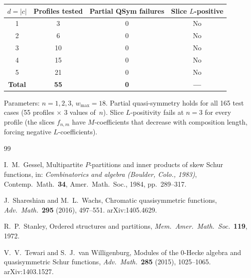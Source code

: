 \documentclass[11pt]{article}
\begin{document}
\begin{center}
\begin{tabular}{c|c|c|c}
  $d = |c|$ & Profiles tested & Partial QSym failures
  & Slice $L$-positive \\
  \hline
  1 & 3 & 0 & No \\
  2 & 6 & 0 & No \\
  3 & 10 & 0 & No \\
  4 & 15 & 0 & No \\
  5 & 21 & 0 & No \\
  \hline
  \textbf{Total} & \textbf{55} & \textbf{0} & \textbf{---}
\end{tabular}
\end{center}

Parameters: $n = 1, 2, 3$, $w_{\max} = 18$.
Partial quasi-symmetry holds for all 165 test cases
(55 profiles $\times$ 3 values of~$n$).
Slice $L$-positivity fails at $n = 3$ for every profile
(the slices $f_{n,m}$ have $M$-coefficients that decrease
with composition length, forcing negative $L$-coefficients).


\begin{thebibliography}{99}

I.~M.~Gessel,
Multipartite $P$-partitions and inner products of skew Schur functions,
in: \emph{Combinatorics and algebra (Boulder, Colo., 1983)},
Contemp.\ Math.\ \textbf{34}, Amer.\ Math.\ Soc., 1984, pp.~289--317.

J.~Shareshian and M.~L.~Wachs,
Chromatic quasisymmetric functions,
\emph{Adv.\ Math.}\ \textbf{295} (2016), 497--551.
arXiv:1405.4629.

R.~P.~Stanley,
Ordered structures and partitions,
\emph{Mem.\ Amer.\ Math.\ Soc.}\ \textbf{119}, 1972.

V.~V.~Tewari and S.~J.~van Willigenburg,
Modules of the $0$-Hecke algebra and quasisymmetric Schur functions,
\emph{Adv.\ Math.}\ \textbf{285} (2015), 1025--1065.
arXiv:1403.1527.

\end{thebibliography}
\end{document}
